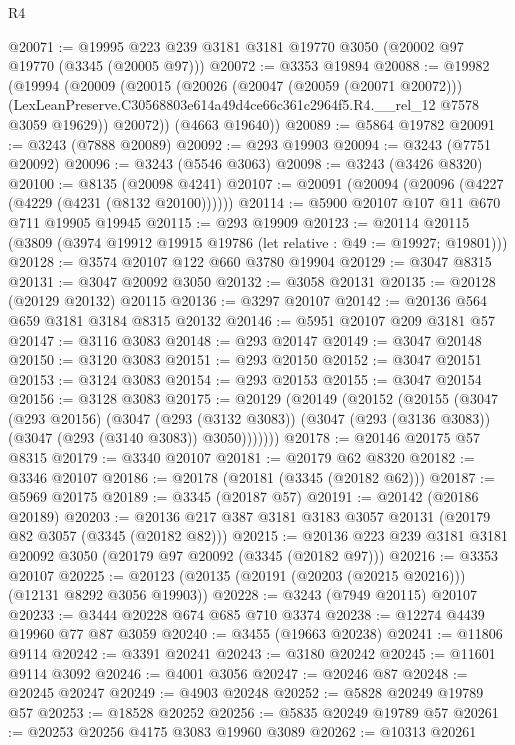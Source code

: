 \begin{lexlean}{R4}
\begin{coremodule}
@20071 := @19995 @223 @239 @3181 @3181 @19770 @3050 (@20002 @97 @19770 (@3345 (@20005 @97)))
@20072 := @3353 @19894
@20088 := @19982
    (@19994
      (@20009
        (@20015
          (@20026
            (@20047 (@20059 (@20071 @20072)))
            (LexLeanPreserve.C30568803e614a49d4ce66c361c2964f5.R4.__rel_12 @7578 @3059 @19629))
          @20072))
      (@4663 @19640))
@20089 := @5864 @19782
@20091 := @3243 (@7888 @20089)
@20092 := @293 @19903
@20094 := @3243 (@7751 @20092)
@20096 := @3243 (@5546 @3063)
@20098 := @3243 (@3426 @8320)
@20100 := @8135 (@20098 @4241)
@20107 := @20091 (@20094 (@20096 (@4227 (@4229 (@4231 (@8132 @20100))))))
@20114 := @5900 @20107 @107 @11 @670 @711 @19905 @19945
@20115 := @293 @19909
@20123 := @20114 @20115 (@3809 (@3974 @19912 @19915 @19786 (let relative : @49 := @19927; @19801)))
@20128 := @3574 @20107 @122 @660 @3780 @19904
@20129 := @3047 @8315
@20131 := @3047 @20092 @3050
@20132 := @3058 @20131
@20135 := @20128 (@20129 @20132) @20115
@20136 := @3297 @20107
@20142 := @20136 @564 @659 @3181 @3184 @8315 @20132
@20146 := @5951 @20107 @209 @3181 @57
@20147 := @3116 @3083
@20148 := @293 @20147
@20149 := @3047 @20148
@20150 := @3120 @3083
@20151 := @293 @20150
@20152 := @3047 @20151
@20153 := @3124 @3083
@20154 := @293 @20153
@20155 := @3047 @20154
@20156 := @3128 @3083
@20175 := @20129
    (@20149
      (@20152
        (@20155
          (@3047
            (@293 @20156)
            (@3047
              (@293 (@3132 @3083))
              (@3047 (@293 (@3136 @3083)) (@3047 (@293 (@3140 @3083)) @3050)))))))
@20178 := @20146 @20175 @57 @8315
@20179 := @3340 @20107
@20181 := @20179 @62 @8320
@20182 := @3346 @20107
@20186 := @20178 (@20181 (@3345 (@20182 @62)))
@20187 := @5969 @20175
@20189 := @3345 (@20187 @57)
@20191 := @20142 (@20186 @20189)
@20203 := @20136 @217 @387 @3181 @3183 @3057 @20131 (@20179 @82 @3057 (@3345 (@20182 @82)))
@20215 := @20136 @223 @239 @3181 @3181 @20092 @3050 (@20179 @97 @20092 (@3345 (@20182 @97)))
@20216 := @3353 @20107
@20225 := @20123 (@20135 (@20191 (@20203 (@20215 @20216))) (@12131 @8292 @3056 @19903))
@20228 := @3243 (@7949 @20115) @20107
@20233 := @3444 @20228 @674 @685 @710 @3374
@20238 := @12274 @4439 @19960 @77 @87 @3059
@20240 := @3455 (@19663 @20238)
@20241 := @11806 @9114
@20242 := @3391 @20241
@20243 := @3180 @20242
@20245 := @11601 @9114 @3092
@20246 := @4001 @3056
@20247 := @20246 @87
@20248 := @20245 @20247
@20249 := @4903 @20248
@20252 := @5828 @20249 @19789 @57
@20253 := @18528 @20252
@20256 := @5835 @20249 @19789 @57
@20261 := @20253 @20256 @4175 @3083 @19960 @3089
@20262 := @10313 @20261

\end{coremodule}
\end{lexlean}
